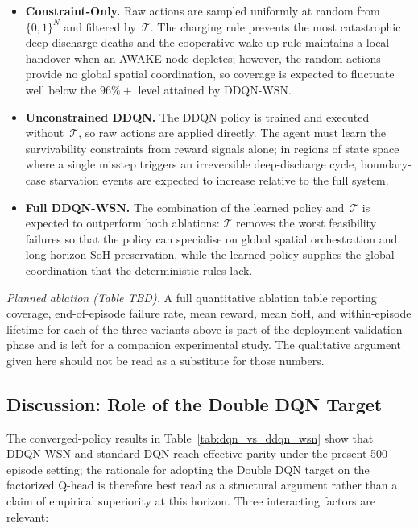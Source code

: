 \documentclass[journal]{IEEEtran}
\begin{document}
\begin{itemize}
  \item \textbf{Constraint-Only.} Raw actions are sampled uniformly
    at random from $\{0,1\}^N$ and filtered by~$\mathcal{T}$. The
    charging rule prevents the most catastrophic deep-discharge
    deaths and the cooperative wake-up rule maintains a local
    handover when an AWAKE node depletes; however, the random
    actions provide no global spatial coordination, so coverage is
    expected to fluctuate well below the $96\%+$ level attained by
    DDQN-WSN.
  \item \textbf{Unconstrained DDQN.} The DDQN policy is trained and
    executed without~$\mathcal{T}$, so raw actions are applied
    directly. The agent must learn the survivability constraints
    from reward signals alone; in regions of state space where a
    single misstep triggers an irreversible deep-discharge cycle,
    boundary-case starvation events are expected to increase
    relative to the full system.
  \item \textbf{Full DDQN-WSN.} The combination of the learned
    policy and~$\mathcal{T}$ is expected to outperform both
    ablations: $\mathcal{T}$ removes the worst feasibility failures
    so that the policy can specialise on global spatial
    orchestration and long-horizon SoH preservation, while the
    learned policy supplies the global coordination that the
    deterministic rules lack.
\end{itemize}

\textit{Planned ablation (Table TBD).} A full quantitative ablation
table reporting coverage, end-of-episode failure rate, mean reward,
mean SoH, and within-episode lifetime for each of the three variants
above is part of the deployment-validation phase and is left for a
companion experimental study. The qualitative argument given here
should not be read as a substitute for those numbers.
\subsection{Discussion: Role of the Double DQN Target}

The converged-policy results in Table~\ref{tab:dqn_vs_ddqn_wsn} show
that DDQN-WSN and standard DQN reach effective parity under the
present 500-episode setting; the rationale for adopting the Double
DQN target on the factorized Q-head is therefore best read as a
structural argument rather than a claim of empirical superiority at
this horizon. Three interacting factors are relevant:
\end{document}
